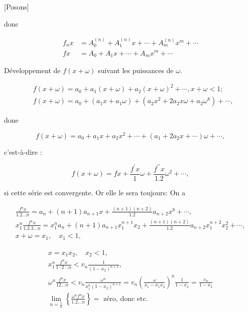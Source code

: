 \documentclass{article}
\begin{document}
[Posons]

donc

\[
\begin{aligned}
f_{n} x & =A_{0}^{(n)}+A_{1}^{(n)} x+\cdots+A_{m}^{(n)} x^{m}+\cdots \\
f x & =A_{0}+A_{1} x+\cdots+A_{m} x^{m}+\cdots
\end{aligned}
\]

Développement de \(f(x+\omega)\) suivant les puissances de \(\omega\).

\[
\begin{aligned}
& f(x+\omega)=a_{0}+a_{1}(x+\omega)+a_{2}(x+\omega)^{2}+\cdots, x+\omega<1 ; \\
& f(x+\omega)=a_{0}+\left(a_{1} x+a_{1} \omega\right)+\left(a_{2} x^{2}+2 a_{2} x \omega+a_{2} \omega^{8}\right)+\cdots,
\end{aligned}
\]

done

\[
f(x+\omega)=a_{0}+a_{1} x+a_{2} x^{2}+\cdots+\left(a_{1}+2 a_{2} x+\cdots\right) \omega+\cdots,
\]

c'est-à-dire :

\[
f(x+\omega)=f x+\frac{f^{\prime} x}{1} \omega+\frac{f^{\prime \prime} x}{1.2} \omega^{2}+\cdots,
\]

si cette série est convergente. Or elle le sera toujours: On a

\[
\begin{gathered}
\frac{f^{n} x}{1.2 \ldots n}=a_{n}+(n+1) a_{n+1} x+\frac{(n+1)(n+2)}{1.2} a_{n+2} x^{8}+\cdots, \\
x_{1}^{n} \frac{f^{n} x}{1.2 .3 \ldots n}=x_{1}^{n} a_{n}+(n+1) a_{n+1} x_{1}^{n+1} x_{2}+\frac{(n+1)(n+2)}{1.2} a_{n+2} x_{1}^{n+2} x_{2}^{2}+\cdots, \\
x+\omega=x_{1}, \quad x_{1}<1,
\end{gathered}
\]

\[
\begin{gathered}
x=x_{1} x_{2}, \quad x_{2}<1, \\
x_{1}^{n} \frac{f^{n} x}{1 \cdot 2 \cdot . n}<v_{n} \frac{1}{\left(1-x_{2}\right)^{n+1}}, \\
\omega^{n} \frac{f^{n} x}{12 \ldots n}<v_{n} \frac{\omega^{n}}{x_{1}^{n}\left(1-x_{2}\right)^{n+1}}=v_{n}\left(\frac{\omega}{x_{1}-x_{1} x_{2}}\right)^{n} \frac{1}{1-x_{2}}=\frac{v_{n}}{1-x_{2}} \\
\lim _{n=\frac{1}{n}}\left\{\frac{\omega^{n} f^{n} x}{1.2 \ldots n}\right\}=\text { zéro, donc etc. }
\end{gathered}
\]
\end{document}
